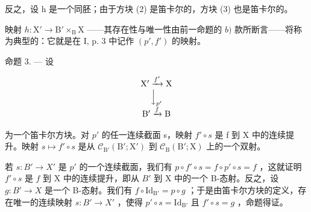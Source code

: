 反之，设 h 是一个同胚；由于方块 (2) 是笛卡尔的，方块 (3) 也是笛卡尔的。

映射 \(h \colon \mathrm{X}' \to \mathrm{B}' \times_{\mathrm{B}} \mathrm{X}\) ——其存在性与唯一性由前一命题的 \(b)\) 款所断言——将称为典型的：它就是在 I, p. 3 中记作 \((p', f')\) 的映射。

命题 3. --- 设

\[
\begin{array}{c} \mathrm {X^ {\prime}} \xrightarrow {f ^ {\prime}} \mathrm{X} \\ \Big \downarrow_ {p ^ {\prime}} \\ \mathrm {B^ {\prime}} \xrightarrow {f} \mathrm{B} \end{array}
\]

为一个笛卡尔方块。对 \(p'\) 的任一连续截面 s，映射 \(f'\circ s\) 是 f 到 X 中的连续提升。映射 \(s\mapsto f'\circ s\) 是从 \(\mathcal{C}_{\mathrm{B}'}(\mathrm{B}';\mathrm{X}')\) 到 \(\mathcal{C}_{\mathrm{B}}(\mathrm{B}';\mathrm{X})\) 上的一个双射。

若 \(s \colon B' \to X'\) 是 \(p'\) 的一个连续截面，我们有 \(p \circ f' \circ s = f \circ p' \circ s = f\) ，这就证明 \(f' \circ s\) 是 \(f\) 到 X 中的连续提升，即从 \(B'\) 到 X 中的一个 B-态射。反之，设 \(g \colon B' \to X\) 是一个 B-态射。我们有 \(f \circ \mathrm{Id}_{\mathrm{B}'} = p \circ g\) ；于是由笛卡尔方块的定义，存在唯一的连续映射 \(s \colon B' \to X'\) ，使得 \(p' \circ s = \mathrm{Id}_{\mathrm{B}'}\) 且 \(f' \circ s = g\) ，命题得证。

